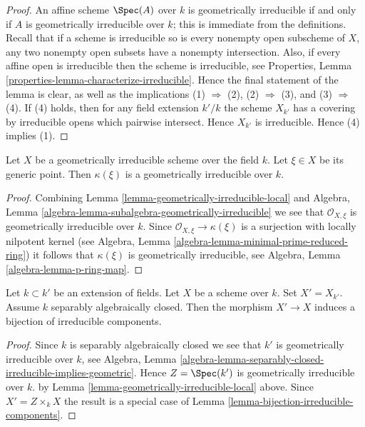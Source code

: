 \begin{proof}
An affine scheme $\Spec(A)$ over $k$ is geometrically
irreducible if and only if $A$ is geometrically irreducible over $k$;
this is immediate from the definitions.
Recall that if a scheme is irreducible so is every nonempty
open subscheme of $X$, any two nonempty open subsets have
a nonempty intersection. Also, if every affine open is irreducible
then the scheme is irreducible, see Properties,
Lemma \ref{properties-lemma-characterize-irreducible}.
Hence the final statement of the lemma
is clear, as well as the implications (1) $\Rightarrow$ (2),
(2) $\Rightarrow$ (3), and (3) $\Rightarrow$ (4). If (4) holds,
then for any field extension $k'/k$ the scheme $X_{k'}$
has a covering by irreducible opens which pairwise intersect.
Hence $X_{k'}$ is irreducible. Hence (4) implies (1).
\end{proof}

\begin{lemma}
\label{lemma-geometrically-irreducible-function-field}
Let $X$ be a geometrically irreducible scheme over the field $k$.
Let $\xi \in X$ be its generic point. Then $\kappa(\xi)$ is a
geometrically irreducible over $k$.
\end{lemma}

\begin{proof}
Combining
Lemma \ref{lemma-geometrically-irreducible-local}
and
Algebra, Lemma \ref{algebra-lemma-subalgebra-geometrically-irreducible}
we see that $\mathcal{O}_{X, \xi}$ is geometrically irreducible over $k$.
Since $\mathcal{O}_{X, \xi} \to \kappa(\xi)$ is a surjection with
locally nilpotent kernel (see
Algebra, Lemma \ref{algebra-lemma-minimal-prime-reduced-ring})
it follows that $\kappa(\xi)$ is geometrically irreducible, see
Algebra, Lemma \ref{algebra-lemma-p-ring-map}.
\end{proof}

\begin{lemma}
\label{lemma-separably-closed-field-irreducible-components}
Let $k \subset k'$ be an extension of fields.
Let $X$ be a scheme over $k$. Set $X' = X_{k'}$.
Assume $k$ separably algebraically closed.
Then the morphism $X' \to X$ induces a bijection of irreducible components.
\end{lemma}

\begin{proof}
Since $k$ is separably algebraically closed we see that
$k'$ is geometrically irreducible over $k$, see Algebra,
Lemma \ref{algebra-lemma-separably-closed-irreducible-implies-geometric}.
Hence $Z = \Spec(k')$ is geometrically irreducible over $k$.
by Lemma \ref{lemma-geometrically-irreducible-local} above.
Since $X' = Z \times_k X$ the result is a special case
of Lemma \ref{lemma-bijection-irreducible-components}.
\end{proof}

